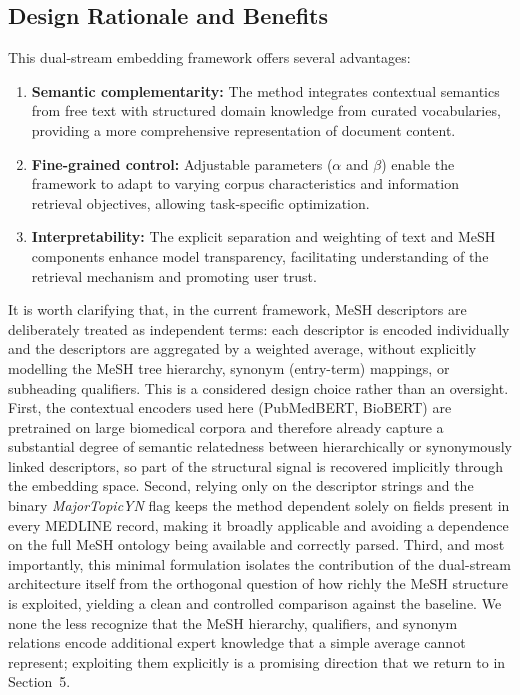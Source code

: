 \documentclass[authorproof,JACIII,researchpaper]{fujipressarticle}
\begin{document}
\subsection{Design Rationale and Benefits}
This dual-stream embedding framework offers several advantages:
\begin{enumerate}[leftmargin=*,label=\arabic*)]
    \item \textbf{Semantic complementarity:} The method integrates contextual semantics from free text with structured domain knowledge from curated vocabularies, providing a more comprehensive representation of document content.

    \item \textbf{Fine-grained control:} Adjustable parameters ($\alpha$ and $\beta$) enable the framework to adapt to varying corpus characteristics and information retrieval objectives, allowing task-specific optimization.

    \item \textbf{Interpretability:} The explicit separation and weighting of text and MeSH components enhance model transparency, facilitating understanding of the retrieval mechanism and promoting user trust.
\end{enumerate}

It is worth clarifying that, in the current framework, MeSH descriptors are deliberately treated as independent terms: each descriptor is encoded individually and the descriptors are aggregated by a weighted average, without explicitly modelling the MeSH tree hierarchy, synonym (entry-term) mappings, or subheading qualifiers. This is a considered design choice rather than an oversight. First, the contextual encoders used here (PubMedBERT, BioBERT) are pretrained on large biomedical corpora and therefore already capture a substantial degree of semantic relatedness between hierarchically or synonymously linked descriptors, so part of the structural signal is recovered implicitly through the embedding space. Second, relying only on the descriptor strings and the binary \textit{MajorTopicYN} flag keeps the method dependent solely on fields present in every MEDLINE record, making it broadly applicable and avoiding a dependence on the full MeSH ontology being available and correctly parsed. Third, and most importantly, this minimal formulation isolates the contribution of the dual-stream architecture itself from the orthogonal question of how richly the MeSH structure is exploited, yielding a clean and controlled comparison against the baseline. We none the less recognize that the MeSH hierarchy, qualifiers, and synonym relations encode additional expert knowledge that a simple average cannot represent; exploiting them explicitly is a promising direction that we return to in Section~5.
\end{document}
